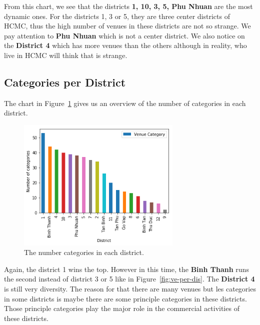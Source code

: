 \documentclass[12pt,a4paper]{article}
\begin{document}
From this chart, we see that the districts \textbf{1, 10, 3, 5, Phu Nhuan} are the most dynamic ones. For the districts 1, 3 or 5, they are three center districts of HCMC, thus the high number of venues in these districts are not so strange. We pay attention to \textbf{Phu Nhuan} which is not a center district. We also notice on the \textbf{District 4} which has more venues than the others although in reality, who live in HCMC will think that is strange.

\subsection{Categories per District}

The chart in Figure~\ref{fig:cat-per-dis} gives us an overview of the number of categories in each district.

\begin{center}
    \begin{figure}[htp]
    \begin{center}
     \includegraphics[width=0.7\textwidth]{fig/cat-per-dis}
    \end{center}
    \caption{The number categories in each district.}
    \label{fig:cat-per-dis}
    \end{figure}
\end{center}

Again, the district 1 wins the top. However in this time, the \textbf{Binh Thanh} runs the second instead of district 3 or 5 like in Figure~\ref{fig:ve-per-dis}. The \textbf{District 4} is still very diversity. The reason for that there are many venues but les categories in some districts is maybe there are some principle categories in these districts. Those principle categories play the major role in the commercial activities of these districts.
\end{document}
